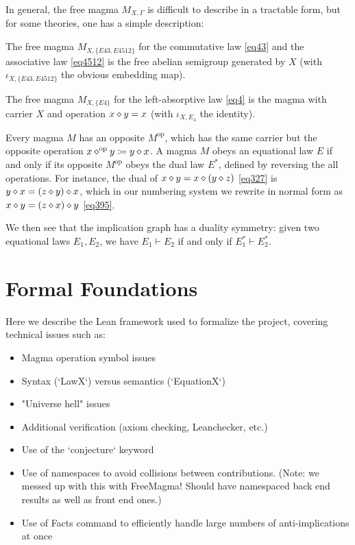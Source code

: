 In general, the free magma $M_{X,\Gamma}$ is difficult to describe in a tractable form, but for some theories, one has a simple description:

\begin{example}\label{semi-group} The free magma $M_{X,\{E43, E4512\}}$ for the commutative law \eqref{eq43} and the associative law \eqref{eq4512} is the free abelian semigroup generated by $X$ (with $\iota_{X,\{E43,E4512\}}$ the obvious embedding map).
\end{example}

\begin{example}\label{left-absorb}
The free magma $M_{X,\{E4\}}$ for the left-absorptive law \eqref{eq4} is the magma with carrier $X$ and operation $x \diamond y = x$ (with $\iota_{X,E_4}$ the identity).
\end{example}


Every magma $M$ has an opposite $M^{\mathrm{op}}$, which has the same carrier but the opposite operation $x \diamond^{\mathrm{op}} y \coloneqq y \diamond x$.  A magma $M$ obeys an equational law $E$ if and only if its opposite $M^{\mathrm{op}}$ obeys the dual law $E^*$, defined by reversing the all operations.  For instance, the dual of
$x \diamond y = x \diamond (y \diamond z)$ \eqref{eq327} is $y \diamond x = (z \diamond y) \diamond x$, which in our numbering system we rewrite in normal form as $x \diamond y = (z \diamond x) \diamond y$ \eqref{eq395}.

We then see that the implication graph has a duality symmetry: given two equational laws $E_1,E_2$, we have $E_1 \vdash E_2$ if and only if $E_1^* \vdash E_2^*$.

\section{Formal Foundations}


Here we describe the Lean framework used to formalize the project, covering technical issues such as:

\begin{itemize}
    \item Magma operation symbol issues
    \item Syntax (`LawX`) versus semantics (`EquationX`)
    \item "Universe hell" issues
    \item Additional verification (axiom checking, Leanchecker, etc.)
    \item Use of the `conjecture` keyword
    \item Use of namespaces to avoid collisions between contributions. (Note: we messed up with this with FreeMagma! Should have namespaced back end results as well as front end ones.)
    \item Use of Facts command to efficiently handle large numbers of anti-implications at once
\end{itemize}

